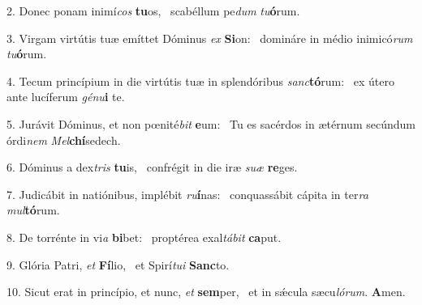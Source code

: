 2. Donec ponam inimí\textit{cos} \textbf{tu}os, \ast\  scabéllum pe\textit{dum} \textit{tu}\textbf{ó}rum.\

3. Virgam virtútis tuæ emíttet Dóminus \textit{ex} \textbf{Si}on: \ast\  domináre in médio inimicó\textit{rum} \textit{tu}\textbf{ó}rum.\

4. Tecum princípium in die virtútis tuæ in splendóribus \textit{sanc}\textbf{tó}rum: \ast\  ex útero ante lucíferum \textit{gé}\textit{nu}\textbf{i} te.\

5. Jurávit Dóminus, et non pœnité\textit{bit} \textbf{e}um: \ast\  Tu es sacérdos in ætérnum secúndum órdi\textit{nem} \textit{Mel}\textbf{chí}sedech.\

6. Dóminus a dex\textit{tris} \textbf{tu}is, \ast\  confrégit in die iræ \textit{su}\textit{æ} \textbf{re}ges.\

7. Judicábit in natiónibus, implébit \textit{ru}\textbf{í}nas: \ast\  conquassábit cápita in ter\textit{ra} \textit{mul}\textbf{tó}rum.\

8. De torrénte in vi\textit{a} \textbf{bi}bet: \ast\  proptérea exal\textit{tá}\textit{bit} \textbf{ca}put.\

9. Glória Patri, \textit{et} \textbf{Fí}lio, \ast\  et Spirí\textit{tu}\textit{i} \textbf{Sanc}to.\

10. Sicut erat in princípio, et nunc, \textit{et} \textbf{sem}per, \ast\  et in sǽcula sæcu\textit{ló}\textit{rum}. \textbf{A}men.\

